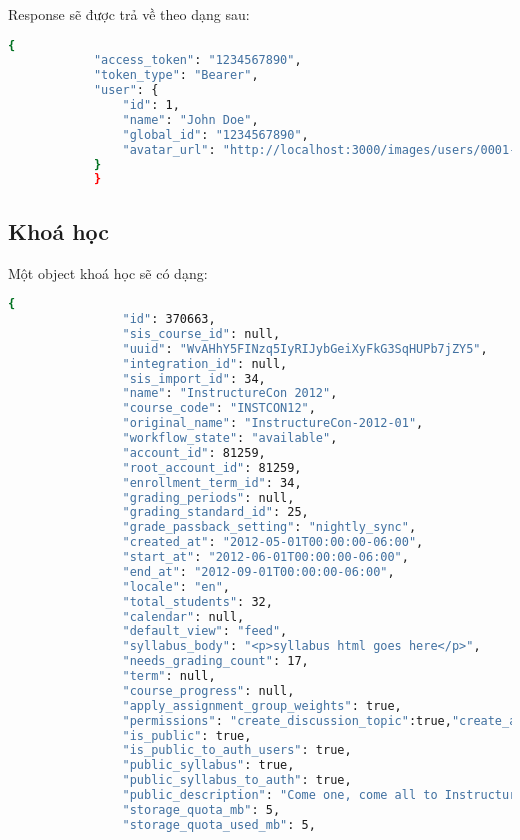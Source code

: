 \documentclass[../Thesis.tex]{subfiles}
\begin{document}
        Response sẽ được trả về theo dạng sau:
        \begin{lstlisting}[language=bash]
            {
            "access_token": "1234567890",
            "token_type": "Bearer",
            "user": {
                "id": 1,
                "name": "John Doe",
                "global_id": "1234567890",
                "avatar_url": "http://localhost:3000/images/users/0001-1234567890/avatar.png"
            }
            }
        \end{lstlisting}

\subsection{Khoá học}

            Một object khoá học sẽ có dạng: 
            \begin{lstlisting}[language=bash]
            {
                "id": 370663,
                "sis_course_id": null,
                "uuid": "WvAHhY5FINzq5IyRIJybGeiXyFkG3SqHUPb7jZY5",
                "integration_id": null,
                "sis_import_id": 34,
                "name": "InstructureCon 2012",
                "course_code": "INSTCON12",
                "original_name": "InstructureCon-2012-01",
                "workflow_state": "available",
                "account_id": 81259,
                "root_account_id": 81259,
                "enrollment_term_id": 34,
                "grading_periods": null,
                "grading_standard_id": 25,
                "grade_passback_setting": "nightly_sync",
                "created_at": "2012-05-01T00:00:00-06:00",
                "start_at": "2012-06-01T00:00:00-06:00",
                "end_at": "2012-09-01T00:00:00-06:00",
                "locale": "en",
                "total_students": 32,
                "calendar": null,
                "default_view": "feed",
                "syllabus_body": "<p>syllabus html goes here</p>",
                "needs_grading_count": 17,
                "term": null,
                "course_progress": null,
                "apply_assignment_group_weights": true,
                "permissions": "create_discussion_topic":true,"create_announcement":true,
                "is_public": true,
                "is_public_to_auth_users": true,
                "public_syllabus": true,
                "public_syllabus_to_auth": true,
                "public_description": "Come one, come all to InstructureCon 2012!",
                "storage_quota_mb": 5,
                "storage_quota_used_mb": 5,

\end{lstlisting}
\end{document}
